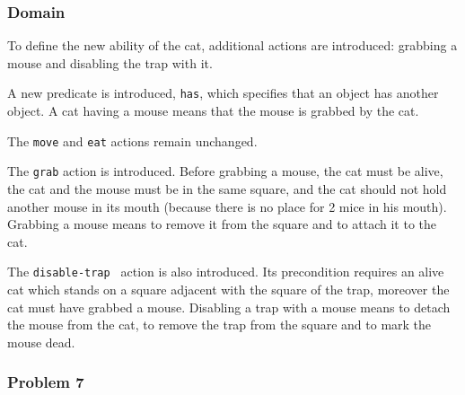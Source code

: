 \subsubsection{Domain}

To define the new ability of the cat, additional actions are introduced: grabbing a mouse and disabling the trap with it.

A new predicate is introduced, \verb|has|, which specifies that an object has another object. A cat having a mouse means that the mouse is grabbed by the cat.



The \verb|move| and \verb|eat| actions remain unchanged.

The \verb|grab| action is introduced. Before grabbing a mouse, the cat must be alive, the cat and the mouse must be in the same square, and the cat should not hold another mouse in its mouth (because there is no place for 2 mice in his mouth). Grabbing a mouse means to remove it from the square and to attach it to the cat.



The \verb|disable-trap | action is also introduced. Its precondition requires an alive cat which stands on a square adjacent with the square of the trap, moreover the cat must have grabbed a mouse. Disabling a trap with a mouse means to detach the mouse from the cat, to remove the trap from the square and to mark the mouse dead.




\subsubsection{Problem 7}

